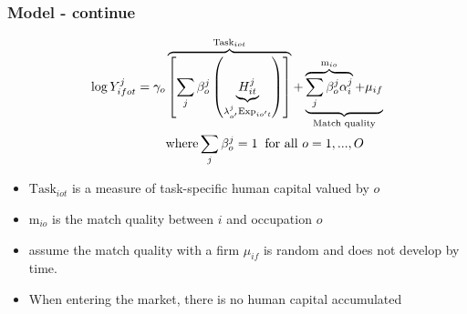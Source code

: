 \documentclass[11pt]{beamer}
\begin{document}
\begin{frame}
	\frametitle{Model - continue}
\begin{align}
	\label{eq:eq9}
	\log{Y_{ifot}^j} = \gamma_o&\overbrace{\left[  \sum_j \beta_{o}^j \left( \underbrace{H_{it}^{j}}_{\lambda_{o'}^j \text{Exp}_{io't}}\right)  \right]}^{\text{Task}_{iot}} + \underbrace{\overbrace{\sum_j \beta_{o}^j \alpha_{i}^j }^{\text{m}_{io}}+\mu_{if}}_{\text{Match quality}}\\
	&\text{where} \sum_{j} \beta_{o}^j = 1 \;\;\text{for all }o=1,...,O \notag
\end{align}

	
	\begin{itemize}
		\item $\text{Task}_{iot}$ is a measure of task-specific human capital valued by $o$
		\item $\text{m}_{io}$ is the match quality between $i$ and occupation $o$
		\item assume the match quality with a firm $\mu_{if}$ is random and does not develop by time.
		\item When entering the market, there is no human capital accumulated
	\end{itemize}
	
\end{frame}
\end{document}
